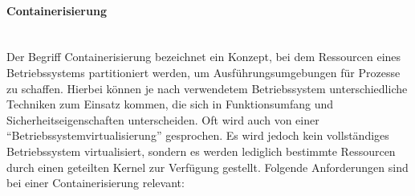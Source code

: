 \paragraph{Containerisierung}
\noindent \\Der Begriff Containerisierung bezeichnet ein Konzept, bei dem Ressourcen eines Betriebssystems partitioniert werden, um Ausf\"uhrungsumgebungen f\"ur Prozesse zu schaffen. Hierbei k\"onnen je nach verwendetem Betriebssystem unterschiedliche Techniken zum Einsatz kommen, die sich in Funktionsumfang und Sicherheitseigenschaften unterscheiden. Oft wird auch von einer "`Betriebssystemvirtualisierung"' gesprochen. Es wird jedoch kein vollst\"andiges Betriebssystem
virtualisiert, sondern es werden lediglich bestimmte Ressourcen durch einen geteilten Kernel zur Verf\"ugung gestellt. Folgende Anforderungen sind bei einer Containerisierung relevant:

